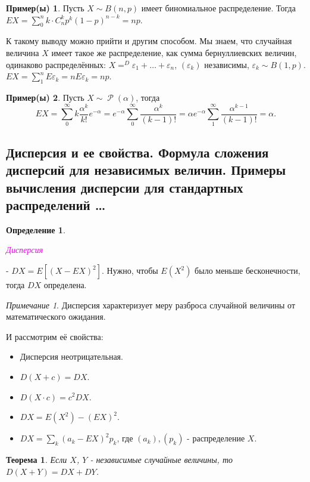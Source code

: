 \documentclass[a4paper,100pt]{article}
\theoremstyle{indented}
\newtheorem{theorem}{Теорема}
\theoremstyle{definition}
\newtheorem{defn}{Определение}
\newtheorem{exl}{Пример(ы)}
\theoremstyle{remark}
\newtheorem{remark}{Примечание}
\DeclareMathOperator{\Rho}{\mathcal{P}}
\begin{document}
\begin{exl}
  Пусть $X \sim B(n, p)$ имеет биномиальное распределение. Тогда $EX=\sum_0^n k\cdot C_n^kp^k(1-p)^{n-k}=np$. \ 

  К такому выводу можно прийти и другим способом. Мы знаем, что случайная величина $X$ имеет такое же распределение, как сумма бернуллиевских величин, одинаково распределённых: $X=^D\varepsilon_1+\ldots+\varepsilon_n$, $(\varepsilon_k)$ независимы, $\varepsilon_k\sim B(1, p)$. $EX=\sum_1^n E\varepsilon_k=n E\varepsilon_k = np$. 
\end{exl}

\begin{exl}
  Пусть $X\sim \Rho(\alpha)$, тогда 
  \[
      EX = \sum_0^\infty k\frac{\alpha^k}{k!}e^{-\alpha} = e^{-\alpha}\sum_0^\infty \frac{\alpha^k}{(k-1)!} = \alpha e^{-\alpha}\sum_1^\infty \frac{\alpha^{k-1}}{(k-1)!}=\alpha.
  \] 
\end{exl}

\subsection{Дисперсия и ее свойства. Формула сложения дисперсий для независимых величин. Примеры вычисления дисперсии для стандартных распределений \ldots} 

\begin{defn}
  \hypertarget{n14}{\textcolor{magenta}{\textit{Дисперсия}}} - $DX = E[(X-EX)^2]$. Нужно, чтобы $E(X^2)$ было меньше бесконечности, тогда $DX$ определена.
\end{defn}

\begin{remark}
  Дисперсия характеризует меру разброса случайной величины от математического ожидания.
\end{remark}

И рассмотрим её свойства:

\begin{itemize}
  \item Дисперсия неотрицательная.
  \item $D(X+c)=DX$.
  \item $D(X\cdot c)=c^2 DX$.
  \item $DX = E(X^2) - (EX)^2$.
  \item $DX=\sum_k(a_k- EX)^2p_k$, где $(a_k), (p_k)$ - распределение $X$. 
\end{itemize}

\begin{theorem}
  Если $X$, $Y$ - независимые случайные величины, то $D(X+Y)=DX+DY$. 
\end{theorem}
\end{document}
